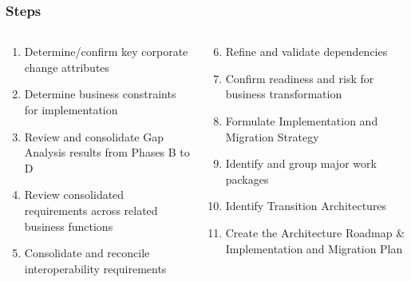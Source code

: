 \documentclass[aspectratio=169, table]{beamer}
\begin{document}
	
	\begin{frame}
		\frametitle{Steps}
		\vspace{20pt}
		\begin{columns}[onlytextwidth]
			\begin{column}{0.50\textwidth}
				\begin{enumerate}
					\item Determine/confirm key corporate change attributes
					\item Determine business constraints for implementation
					\item Review and consolidate Gap Analysis results from Phases B to D
					\item Review consolidated requirements across related business functions
					\item Consolidate and reconcile interoperability requirements
					
				\end{enumerate}
				
			\end{column}
			\begin{column}{0.50\textwidth}
				\begin{enumerate}
					\setcounter{enumi}{5}
					\item Refine and validate dependencies
					\item Confirm readiness and risk for business transformation
					\item Formulate Implementation and Migration Strategy
					\item Identify and group major work packages
					\item Identify Transition Architectures
					\item Create the Architecture Roadmap \& Implementation and Migration Plan
				\end{enumerate}
			\end{column}
		\end{columns}
	\end{frame}
	
\end{document}
